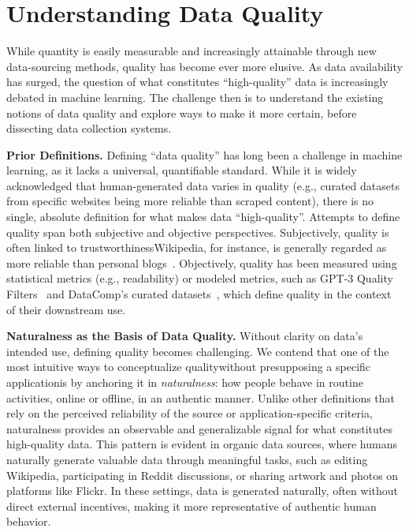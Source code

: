 \section{Understanding Data Quality}
While quantity is easily measurable and increasingly attainable through new data-sourcing methods, quality has become ever more elusive. As data availability has surged, the question of what constitutes ``high-quality'' data is increasingly debated in machine learning. The challenge then is to understand the existing notions of data quality and explore ways to make it more certain, before dissecting data collection systems.

\textbf{Prior Definitions.} Defining ``data quality'' has long been a challenge in machine learning, as it lacks a universal, quantifiable standard. While it is widely acknowledged that human-generated data varies in quality (e.g., curated datasets from specific websites being more reliable than scraped content), there is no single, absolute definition for what makes data ``high-quality''.  Attempts to define quality span both subjective and objective perspectives. Subjectively, quality is often linked to trustworthiness\textemdash{}Wikipedia, for instance, is generally regarded as more reliable than personal blogs~\cite{albalak2024survey,soldaini2024dolma}. Objectively, quality has been measured using statistical metrics (e.g., readability) or modeled metrics, such as GPT-3 Quality Filters~\cite{gururangan2022whose} and DataComp's curated datasets~\cite{li2024datacomp}, which define quality in the context of their downstream use. 


\textbf{Naturalness as the Basis of Data Quality.} Without clarity on data’s intended use, defining quality becomes challenging. We contend that one of the most intuitive ways to conceptualize quality\textemdash{}without presupposing a specific application\textemdash{}is by anchoring it in \textit{naturalness}: how people behave in routine activities, online or offline, in an authentic manner. Unlike other definitions that rely on the perceived reliability of the source or application-specific criteria, naturalness provides an observable and generalizable signal for what constitutes high-quality data. This pattern is evident in organic data sources, where humans naturally generate valuable data through meaningful tasks, such as editing Wikipedia, participating in Reddit discussions, or sharing artwork and photos on platforms like Flickr. In these settings, data is generated naturally, often without direct external incentives, making it more representative of authentic human behavior. %


